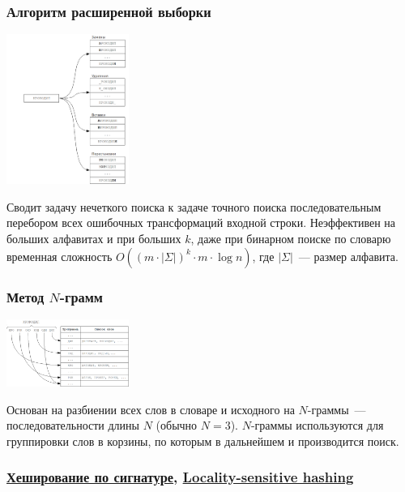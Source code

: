 \subsubsection{Алгоритм расширенной выборки}
\begin{center}
  \includegraphics[width=0.3\textwidth]{resources/19-26/inflate.png}
\end{center}
Сводит задачу нечеткого поиска к задаче точного поиска последовательным перебором всех ошибочных трансформаций входной строки.
Неэффективен на больших алфавитах и при больших \(k\), даже при бинарном поиске по словарю временная сложность
\(O((m\cdot |\Sigma|)^k\cdot m\cdot \log{n})\), где \(|\Sigma|\)~--- размер алфавита.

\subsubsection{Метод \(N\)-грамм}
\begin{center}
  \includegraphics[width=0.3\textwidth]{resources/19-26/n-gramms.png}
\end{center}

Основан на разбиении всех слов в словаре и исходного на \(N\)-граммы~--- последовательности длины \(N\) (обычно \(N = 3\)).
\(N\)-граммы используются для группировки слов в корзины, по которым в дальнейшем и производится поиск.

\subsubsection{\href{https://cs.msu.ru/sites/cmc/files/docs/boycov.pdf}{Хеширование по сигнатуре}, \href{https://en.wikipedia.org/wiki/Locality-sensitive_hashing\#Bit_sampling_for_Hamming_distance}{Locality-sensitive hashing}}

